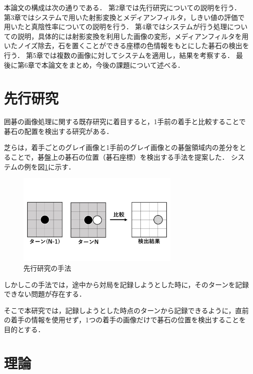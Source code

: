 \documentclass[openright]{nitocs}
\numberwithin{equation}{section}
\begin{document}
        本論文の構成は次の通りである．
        第2章では先行研究についての説明を行う．
        第3章ではシステムで用いた射影変換とメディアンフィルタ，しきい値の評価で用いたと真陰性率についての説明を行う．
        第4章ではシステムが行う処理についての説明，具体的には射影変換を利用した画像の変形，メディアンフィルタを用いたノイズ除去，石を置くことができる座標の色情報をもとにした碁石の検出を行う．
        第5章では複数の画像に対してシステムを適用し，結果を考察する．
        最後に第6章で本論文をまとめ，今後の課題について述べる．

    \section{先行研究} %
        囲碁の画像処理に関する既存研究に着目すると，1手前の着手と比較することで碁石の配置を検出する研究がある．

        芝らは，着手ごとのグレイ画像と1手前のグレイ画像との碁盤領域内の差分をとることで，碁盤上の碁石の位置（碁石座標）を検出する手法を提案した\cite{PilotStudy}．
        システムの例を図\ref{PS_img}に示す．
        \begin{figure}[tb] %
            \begin{center}
            \includegraphics[clip,width=80mm]{PilotStudy_image.jpg} 
            \caption{先行研究の手法}
            \label{PS_img}
            \end{center}
        \end{figure}

        しかしこの手法では，途中から対局を記録しようとした時に，そのターンを記録できない問題が存在する．

        そこで本研究では，記録しようとした時点のターンから記録できるように，直前の着手の情報を使用せず，1つの着手の画像だけで碁石の位置を検出することを目的とする．

    \section{理論} %
    \label{config}
\end{document}
